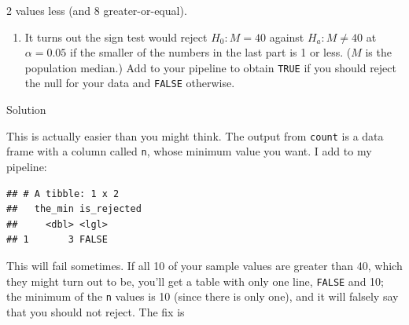 \documentclass[]{tufte-book}
\newenvironment{Shaded}{}{}
\newcommand{\DataTypeTok}[1]{\textcolor[rgb]{0.56,0.13,0.00}{#1}}
\newcommand{\DecValTok}[1]{\textcolor[rgb]{0.25,0.63,0.44}{#1}}
\newcommand{\KeywordTok}[1]{\textcolor[rgb]{0.00,0.44,0.13}{\textbf{#1}}}
\newcommand{\NormalTok}[1]{#1}
\newcommand{\OperatorTok}[1]{\textcolor[rgb]{0.40,0.40,0.40}{#1}}
\newcommand{\StringTok}[1]{\textcolor[rgb]{0.25,0.44,0.63}{#1}}
\providecommand{\tightlist}{%
  \setlength{\itemsep}{0pt}\setlength{\parskip}{0pt}}
\theoremstyle{definition}
\theoremstyle{definition}
\theoremstyle{definition}
\theoremstyle{remark}
\begin{document}
2 values less (and 8 greater-or-equal).

\begin{enumerate}
\def\labelenumi{(\alph{enumi})}
\setcounter{enumi}{3}
\tightlist
\item
  It turns out the sign test would reject \(H_0: M=40\) against
  \(H_a: M \ne 40\) at \(\alpha=0.05\) if the smaller of the numbers in
  the last part is 1 or less. (\(M\) is the population median.) Add to
  your pipeline to obtain \texttt{TRUE} if you should reject the null
  for your data and \texttt{FALSE} otherwise.
\end{enumerate}

Solution

This is actually easier than you might think. The output from
\texttt{count} is a data frame with a column called \texttt{n}, whose
minimum value you want. I add to my pipeline:

\begin{Shaded}
\end{Shaded}

\begin{verbatim}
## # A tibble: 1 x 2
##   the_min is_rejected
##     <dbl> <lgl>      
## 1       3 FALSE
\end{verbatim}

This will fail sometimes. If all 10 of your sample values are greater
than 40, which they might turn out to be, you'll get a table with only
one line, \texttt{FALSE} and 10; the minimum of the \texttt{n} values is
10 (since there is only one), and it will falsely say that you should
not reject. The fix is

\begin{Shaded}
\end{Shaded}
\end{document}
